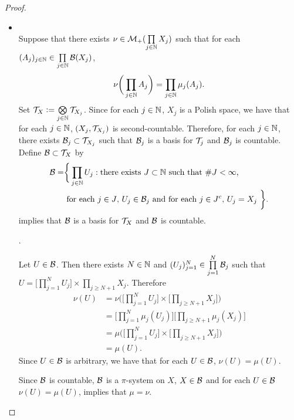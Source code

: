 \documentclass{book}
\begin{document}
\begin{proof}
\begin{itemize}
		
		
		
		
		
		



		\item {} \\
		Suppose that there exists $\nu \in \mathcal{M}_+(\prod\limits_{j \in \mathbb{N}} X_j)$ such that for each $(A_j)_{j \in \mathbb{N}} \in \prod\limits_{j \in \mathbb{N}} \mathcal{B}(X_j)$, 
		$$\nu \bigg(\prod_{j \in \mathbb{N}} A_j \bigg) = \prod_{j \in \mathbb{N}} \mu_j(A_j).$$
		Set $\mathcal{T}_X \vcentcolon= \bigotimes\limits_{j \in \mathbb{N}} \mathcal{T}_{X_j}$. Since for each $j \in \mathbb{N}$, $X_j$ is a Polish space, we have that for each $j \in \mathbb{N}$, $(X_j, \mathcal{T}_{X_j})$ is second-countable. Therefore, for each $j \in \mathbb{N}$, there exists $\mathcal{B}_j \subset \mathcal{T}_{X_j}$ such that $\mathcal{B}_j$ is a basis for $\mathcal{T}_j$ and $\mathcal{B}_j$ is countable. Define $\mathcal{B} \subset \mathcal{T}_X$ by 
		\begin{align*}
			\mathcal{B} = 
			& \bigg \{\prod_{j \in \mathbb{N}} U_j: \text{there exists $J \subset \mathbb{N}$ such that $ \# J < \infty$, } \\
			& \text{ for each $j \in J$, $U_j \in \mathcal{B}_j$ and for each $j \in J^c$, $U_j = X_j$ } \bigg \}.
		\end{align*} 
		 implies that $\mathcal{B}$ is a basis for $\mathcal{T}_X$ and $\mathcal{B}$ is countable. 
		
		. 
		
		Let $U \in \mathcal{B}$. Then there exists $N \in \mathbb{N}$ and $(U_j)_{j=1}^N \in \prod\limits_{j=1}^N \mathcal{B}_j$ such that $U = \bigg[ \prod\limits_{j=1}^N U_j \bigg] \times \prod\limits_{j \geq N+1} X_j$. Therefore 
		\begin{align*}
			\nu(U)
			& = \nu \bigg( \bigg[ \prod\limits_{j=1}^N U_j \bigg] \times \bigg[ \prod\limits_{j \geq N+1} X_j \bigg] \bigg) \\
			& = \bigg[ \prod\limits_{j=1}^N \mu_j(U_j) \bigg]  \bigg[\prod\limits_{j \geq N+1} \mu_j(X_j) \bigg] \\
			& = \mu \bigg( \bigg[ \prod\limits_{j=1}^N U_j \bigg] \times \bigg[ \prod\limits_{j \geq N+1} X_j \bigg] \bigg) \\
			& = \mu(U).
		\end{align*}
		Since $U \in \mathcal{B}$ is arbitrary, we have that for each $U \in \mathcal{B}$, $\nu(U) = \mu(U)$.
		
		Since $\mathcal{B}$ is countable, $\mathcal{B}$ is a $\pi$-system on $X$, $X \in \mathcal{B}$ and for each $U \in \mathcal{B}$ $\nu(U) = \mu(U)$,  implies that $\mu = \nu$. 
		
	\end{itemize}
\end{proof}
\end{document}
